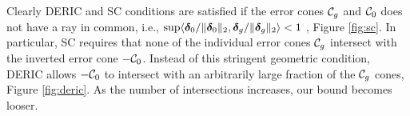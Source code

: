 \begin{remark}
Clearly DERIC and SC conditions are satisfied if the error cones $\cC_g$ and $\cC_0$ does not have a ray in common, i.e., $\sup \langle \boldsymbol{\delta}_0/\|\boldsymbol{\delta}_0\|_{2}, \boldsymbol{\delta}_g/\|\boldsymbol{\delta}_g\|_{2} \rangle < 1$ \cite{trop15, guba16}, Figure \ref{fig:sc}. 
In particular, SC requires that none of the individual error cones $\cC_g$ intersect with the inverted error cone $-\cC_0$.
Instead of this stringent geometric condition, DERIC allows $-\cC_0$ to intersect with an arbitrarily large fraction of the $\cC_g$ cones, Figure \ref{fig:deric}.
As the number of intersections increases, our bound becomes looser.
\end{remark}

%



